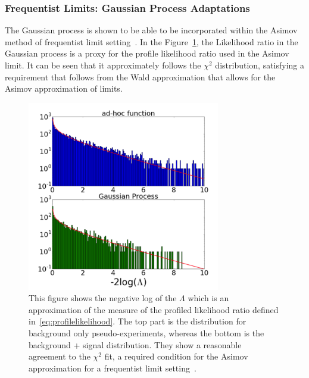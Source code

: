 %


\subsubsection{Frequentist Limits: Gaussian Process Adaptations}
    The Gaussian process is shown to be able to be incorporated within the Asimov method of frequentist limit setting~\cite{frate2017modeling}.
    In the Figure~\ref{fig:chi2}, the Likelihood ratio in the Gaussian process is a proxy for the profile likelihood ratio used in the Asimov limit. It can be seen that it approximately follows the $\chi^{2}$ distribution, satisfying a requirement that follows from the Wald approximation that allows for the Asimov approximation of limits.

    \begin{figure}[!htb]
        \begin{center}
            \includegraphics[width=0.75\textwidth]{figures/chapter_analysismethod/chi2}
                \caption{
                This figure shows the negative log of the $\Lambda$ which is an approximation of the measure of the profiled likelihood ratio defined in~\ref{eq:profilelikelihood}. The top part is the distribution for background only pseudo-experiments, whereas the bottom is the background + signal distribution. They show a reasonable agreement to the $\chi^{2}$ fit, a required condition for the Asimov approximation for a frequentist limit setting~\cite{frate2017modeling}. 
            }
            \label{fig:chi2}
        \end{center}
    \end{figure}
    \FloatBarrier

